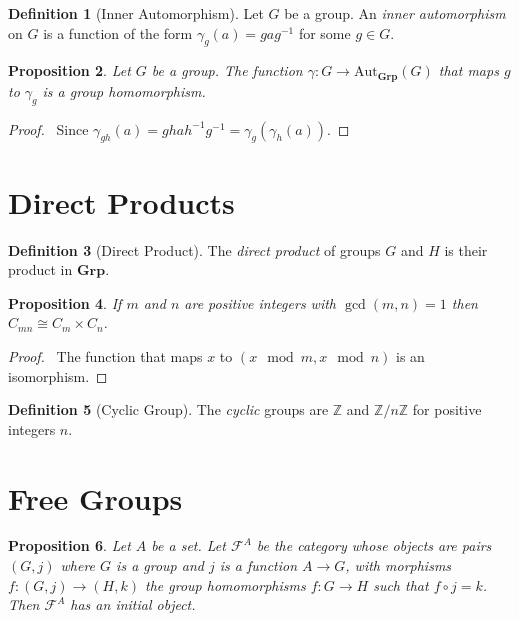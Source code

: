 \documentclass{book}
\let\qed\relax
\newtheorem{prop}{Proposition}[chapter]
\theoremstyle{definition}
\newtheorem{df}[prop]{Definition}
\newcommand{\inv}[1]{\ensuremath{{#1}^{-1}}}
\newcommand{\Aut}[2]{\ensuremath{\mathrm{Aut}_{#1} \left( {#2} \right)}}
\newcommand{\Grp}{\ensuremath{\mathbf{Grp}}}
\begin{document}
\begin{df}[Inner Automorphism]
Let $G$ be a group. An \emph{inner automorphism} on $G$ is a function of the form $\gamma_g(a) = ga\inv{g}$ for some $g \in G$.
\end{df}

\begin{prop}
    Let $G$ be a group.
    The function $\gamma : G \rightarrow \Aut{\Grp}{G}$ that maps $g$ to $\gamma_g$ is a group homomorphism.
\end{prop}

\begin{proof}
    \pf\ Since $\gamma_{gh}(a) = gha\inv{h}\inv{g} = \gamma_g(\gamma_h(a))$. \qed
\end{proof}

\section{Direct Products}

\begin{df}[Direct Product]
    The \emph{direct product} of groups $G$ and $H$ is their product in $\mathbf{Grp}$.
\end{df}

\begin{prop}
    If $m$ and $n$ are positive integers with $\gcd(m,n) = 1$ then $C_{mn} \cong C_m \times C_n$.
\end{prop}

\begin{proof}
    \pf\ The function that maps $x$ to $(x \mod m, x \mod n)$ is an isomorphism. \qed
\end{proof}

\begin{df}[Cyclic Group]
    The \emph{cyclic} groups are $\mathbb{Z}$ and $\mathbb{Z} / n \mathbb{Z}$ for positive integers $n$.
\end{df}

\section{Free Groups}

\begin{prop}
    Let $A$ be a set. Let $\mathcal{F}^A$ be the category whose objects are pairs $(G,j)$ where $G$ is a group and $j$ is a function $A \rightarrow G$, with morphisms $f : (G,j) \rightarrow (H,k)$ the group homomorphisms $f : G \rightarrow H$ such that $f \circ j = k$. Then $\mathcal{F}^A$ has an initial object.
\end{prop}
\end{document}
